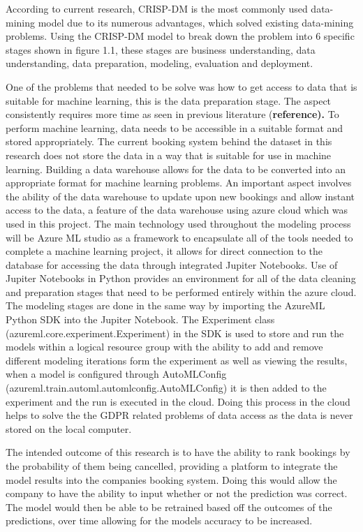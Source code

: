  
  \cite{WirthCRISP-DM:Mining} 


According to current research, CRISP-DM is the most commonly used data-mining model due to its numerous advantages, which solved existing data-mining problems. Using the CRISP-DM model to break down the problem into 6 specific stages shown in figure 1.1, these stages are business understanding, data understanding, data preparation, modeling, evaluation and deployment.

\vspace{5mm}

One of the problems that needed to be solve was how to get access to data that is suitable for machine learning, this is the data preparation stage. The aspect consistently requires more time as seen in previous literature (\textbf{reference).} To perform machine learning, data needs to be accessible in a suitable format and stored appropriately. The current booking system behind the dataset in this research does not store the data in a way that is suitable for use in machine learning. Building a data warehouse allows for the data to be converted into an appropriate format for machine learning problems. An important aspect involves the ability of the data warehouse to update upon new bookings and allow instant access to the data, a feature of the data warehouse using azure cloud which was used in this project. The main technology used throughout the modeling process will be Azure ML studio as a framework to encapsulate all of the tools needed to complete a machine learning project, it allows for direct connection to the database for accessing the data through integrated Jupiter Notebooks. Use of Jupiter Notebooks in Python provides an environment for all of the data cleaning and preparation stages that need to be performed entirely within the azure cloud. The modeling stages are done in the same way by importing the AzureML Python SDK into the Jupiter Notebook. The Experiment class (azureml.core.experiment.Experiment) in the SDK is used to store and run the models within a logical resource group with the ability to add and remove different modeling iterations form the experiment as well as viewing the results, when a model is configured through AutoMLConfig (azureml.train.automl.automlconfig.AutoMLConfig) it is then added to the experiment and the run is executed in the cloud. Doing this process in the cloud helps to solve the the GDPR related problems of data access as the data is never stored on the local computer.

\begin{itemize}
\end{itemize}
\vspace{5mm}

The intended outcome of this research is to have the ability to rank bookings by the probability of them being cancelled, providing a platform to integrate the model results into the companies booking system. Doing this would allow the company to have the ability to input whether or not the prediction was correct. The model would then be able to be retrained based off the outcomes of the predictions, over time allowing for the models accuracy to be increased. 